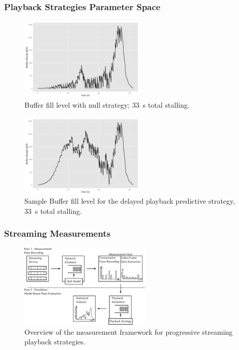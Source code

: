 \documentclass{beamer}
\begin{document}
\begin{frame}
	\frametitle{Playback Strategies Parameter Space}

	\begin{figure}
		\includegraphics[height=4cm]{../../chapters/03-streaming/images/R-bufferlevel-stall.pdf}
		\caption{Buffer fill level with null strategy; \SI{33}{\second} total stalling.}
	\end{figure}

	\begin{figure}
		\includegraphics[height=4cm]{../../chapters/03-streaming/images/R-bufferlevel-startdelay.pdf}
		\caption{Sample Buffer fill level for the delayed playback predictive strategy, \SI{33}{\second} total stalling.}
	\end{figure}
\end{frame}


\begin{frame}
	\frametitle{Streaming Measurements}

	\begin{figure}
		\includegraphics[height=4cm]{../../chapters/03-streaming/images/measurement-model.pdf}
		\caption{Overview of the measurement framework for progressive streaming playback strategies.}
	\end{figure}

\end{frame}
\end{document}
